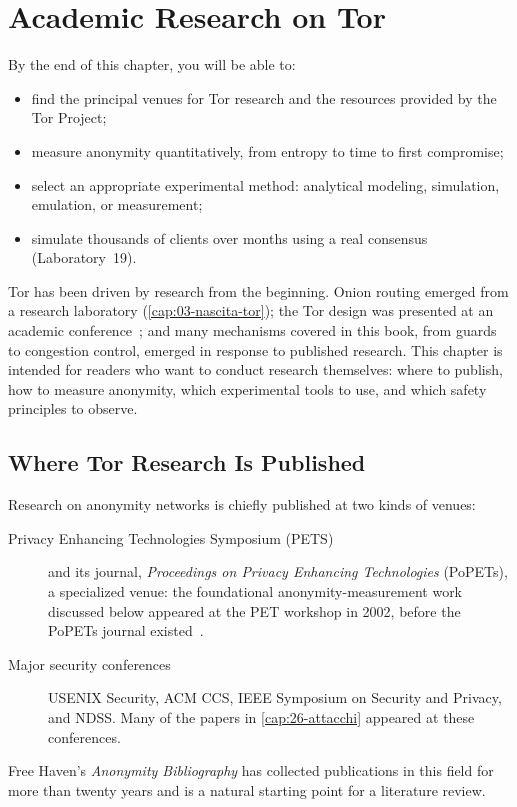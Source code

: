 \chapter{Academic Research on Tor}\label{cap:29-ricerca}

\begin{obiettivi}
By the end of this chapter, you will be able to:
\begin{itemize}[nosep]
  \item find the principal venues for Tor research and the resources provided by the Tor Project;
  \item measure anonymity quantitatively, from entropy to time to first compromise;
  \item select an appropriate experimental method: analytical modeling, simulation, emulation, or measurement;
  \item simulate thousands of clients over months using a real consensus (Laboratory~19).
\end{itemize}
\end{obiettivi}

Tor has been driven by research from the beginning. Onion routing emerged from a research laboratory (\cref{cap:03-nascita-tor}); the Tor design was presented at an academic conference~\cite{dingledine2004tor}; and many mechanisms covered in this book, from guards to congestion control, emerged in response to published research. This chapter is intended for readers who want to conduct research themselves: where to publish, how to measure anonymity, which experimental tools to use, and which safety principles to observe.

\section{Where Tor Research Is Published}\label{sec:ric-dove}

Research on anonymity networks is chiefly published at two kinds of venues:
\begin{description}
  \item[Privacy Enhancing Technologies Symposium (PETS)] and its journal, \emph{Proceedings on Privacy Enhancing Technologies} (PoPETs), a specialized venue: the foundational anonymity-measurement work discussed below appeared at the PET workshop in 2002, before the PoPETs journal existed~\cite{diaz2002measuring}.
  \item[Major security conferences] USENIX Security, ACM CCS, IEEE Symposium on Security and Privacy, and NDSS. Many of the papers in \cref{cap:26-attacchi} appeared at these conferences.
\end{description}
Free Haven's \emph{Anonymity Bibliography} has collected publications in this field for more than twenty years and is a natural starting point for a literature review.

